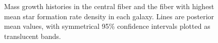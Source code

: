\documentclass[modern]{aastex62}
\begin{document}
\begin{figure}
\hfill
{}

\caption{Mass growth histories in the central fiber and the fiber with highest mean star formation rate density in each galaxy. Lines are posterior mean values, with symmetrical 95\% confidence intervals plotted as translucent bands.}
\label{fig:twomgh}
\end{figure}
\end{document}
